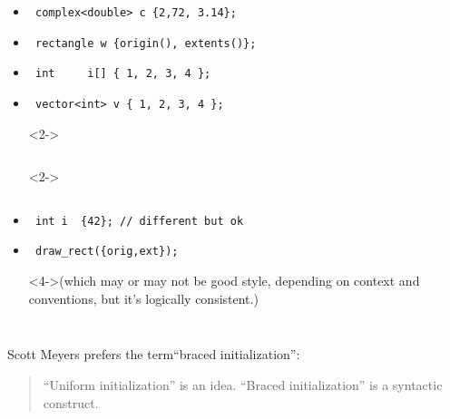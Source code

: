 \begin{frame}[fragile]
\begin{columns}[t]
\begin{itemize}
\item<2->{\scriptsize\begin{verbatim} complex<double> c {2,72, 3.14}; \end{verbatim}}
\item<2->{\scriptsize\begin{verbatim} rectangle w {origin(), extents()};\end{verbatim}}
\item<2->{\scriptsize\begin{verbatim} int     i[] { 1, 2, 3, 4 }; \end{verbatim}}
\item<2->{\scriptsize\begin{verbatim} vector<int> v { 1, 2, 3, 4 };  \end{verbatim}}
\item[] <2->{\scriptsize\begin{verbatim} \end{verbatim}}
\item[] <2->{\scriptsize\begin{verbatim} \end{verbatim}}
\item<3->{\scriptsize\begin{verbatim} int i  {42}; // different but ok\end{verbatim}}
\item<4->{\scriptsize\begin{verbatim} draw_rect({orig,ext});  \end{verbatim}}
\item[]<4->{\scriptsize(which may or may not be good style, depending on context
  and conventions, but it's logically consistent.)}
\end{itemize}
\end{columns}
\pause{}
\vskip 12pt
Scott Meyers prefers the term``braced initialization'':
\begin{quotation}
``Uniform initialization'' is an idea. ``Braced initialization'' is a
  syntactic construct.
\end{quotation}
\end{frame}





